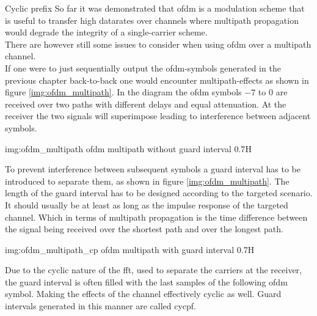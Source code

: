\begin{subchapter}{Cyclic prefix}
  So far it was demonstrated that \gls{ofdm} is a modulation scheme
  that is useful to transfer high datarates over channels
  where multipath propagation would degrade the integrity of
  a single-carrier scheme. \\
  There are however still some issues to consider when using
  \gls{ofdm} over a multipath channel. \\

  If one were to just sequentially output the \acrshort{ofdm}-symbols
  generated in the previous chapter back-to-back one would encounter multipath-effects
  as shown in figure \ref{img:ofdm_multipath}.
  In the diagram the \acrshort{ofdm} symbols $-7$ to $0$ are received
  over two paths with different delays and equal attenuation.
  At the receiver the two signals will superimpose leading
  to interference between adjacent symbols.

               {img:ofdm_multipath}
               {\acrshort{ofdm} multipath without guard interval}
               {0.7}{H}

  To prevent interference between subsequent symbols a guard interval has
  to be introduced to separate them, as shown in figure \ref{img:ofdm_multipath}.
  The length of the guard interval has to be designed according to
  the targeted scenario. It should usually be at least as long as the
  impulse response of the targeted channel.
  Which in terms of multipath propagation is the time difference between
  the signal being received over the shortest path and over the longest path\cite{kammeyer2012}.

               {img:ofdm_multipath_cp}
               {\acrshort{ofdm} multipath with guard interval}
               {0.7}{H}

  Due to the cyclic nature of the \gls{fft}, used to separate the
  carriers at the receiver, the guard interval
  is often filled with the last samples of the following \gls{ofdm}
  symbol. Making the effects of the channel effectively cyclic
  as well.
  Guard intervals generated in this manner are called \gls{cycpf}.
\end{subchapter}

